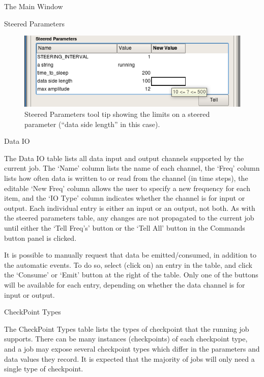 \documentclass[a4paper,twoside]{article}
\begin{document}
\begin{section}{The Main Window}
\begin{subsection}{Steered Parameters}
\begin{figure}
\centerline{\includegraphics{limits_tool_tip.png}}
\caption{Steered Parameters tool tip showing the limits on a steered
parameter (``data side length'' in this case).}
\label{fig:limits_tool_tip}
\end{figure}

\end{subsection} %


\begin{subsection}{Data IO}

The Data IO table lists all data input and output channels supported
by the current job. The `Name' column lists the name of each channel,
the `Freq' column lists how often data is written to or read from the
channel (in time steps), the editable `New Freq' column allows the
user to specify a new frequency for each item, and the `IO Type'
column indicates whether the channel is for input or output.  Each
individual entry is either an input or an output, not both. As with
the steered parameters table, any changes are not propagated to the
current job until either the `Tell Freq's' button or the `Tell All'
button in the Commands button panel is clicked.

It is possible to manually request that data be emitted/consumed, in
addition to the automatic events. To do so, select (click on) an entry
in the table, and click the `Consume' or `Emit' button at the right
of the table. Only one of the buttons will be available for each
entry, depending on whether the data channel is for input or output.

\end{subsection} %


\begin{subsection}{CheckPoint Types}

The CheckPoint Types table lists the types of checkpoint that the
running job supports. There can be many instances (checkpoints) of
each checkpoint type, and a job may expose several checkpoint types
which differ in the parameters and data values they record. It is expected
that the majority of jobs will only need a single type of checkpoint.


\end{subsection}
\end{section}
\end{document}
